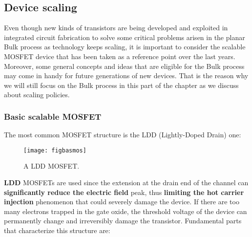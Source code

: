 \documentclass[a4paper, 12pt, twoside, openright]{report}
\begin{document}
{%

\subsection{Device scaling}

Even though new kinds of transistors are being developed and exploited in integrated circuit fabrication to solve some critical problems arisen in the planar Bulk process as technology keeps scaling, it is important to consider the scalable MOSFET device that has been taken as a reference point over the last years. Moreover, some general concepts and ideas that are eligible for the Bulk process may come in handy for future generations of new devices. That is the reason why we will still focus on the Bulk process in this part of the chapter as we discuss about scaling policies. 

\subsubsection{Basic scalable MOSFET} %

The most common MOSFET structure is the LDD (Lightly-Doped Drain) one:

	\begin{figure}[H]
	\centering
	\texttt{[image: figbasmos]}
	\caption{A LDD MOSFET.}
	\label{}
	\end{figure}

\textbf{LDD} MOSFETs are used since the extension at the drain end of the channel can \textbf{significantly reduce the electric field} peak, thus \textbf{limiting the hot carrier injection} phenomenon that could severely damage the device. If there are too many electrons trapped in the gate oxide, the threshold voltage of the device can permanently change and irreversibly damage the transistor.   
Fundamental parts that characterize this structure are:

}
\end{document}
